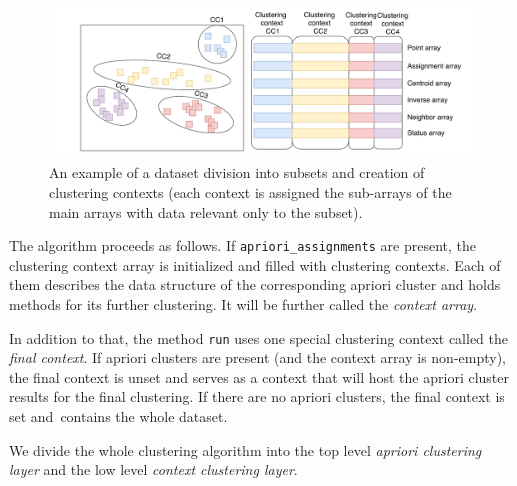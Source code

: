 \begin{figure}\centering
	\includegraphics[width=\linewidth]{img/clustering_context}
	\caption{An example of a dataset division into subsets and creation of clustering contexts (each context is assigned the sub-arrays of the main arrays with data relevant only to the subset).}
	\label{fig03:clust_ctx}
\end{figure}

The algorithm proceeds as follows.
If \texttt{apriori\_assignments} are present, the clustering context array is initialized and filled with clustering contexts. Each of them describes the data structure of the corresponding apriori cluster and holds methods for its further clustering. It will be further called the \emph{context array}. 

In addition to that, the method \texttt{run} uses one special clustering context called the \emph{final context}. If apriori clusters are present (and the context array is non-empty), the final context is unset and serves as a context that will host the apriori cluster results for the final clustering. If there are no apriori clusters, the final context is set and~contains the whole dataset.

We divide the whole clustering algorithm into the top level \emph{apriori clustering layer} and the low level \emph{context clustering layer}.


